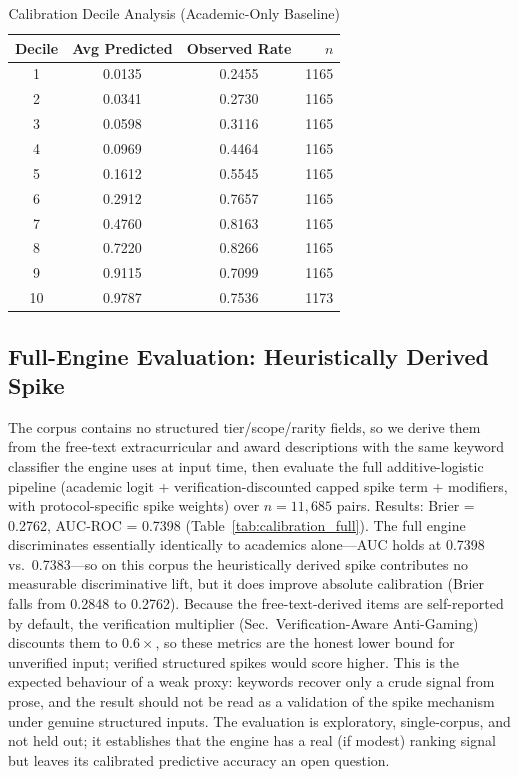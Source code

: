 \documentclass[conference]{IEEEtran}
\begin{document}
\begin{table}[!t]
\centering
\caption{Calibration Decile Analysis (Academic-Only Baseline)}
\label{tab:calibration}
\small
\begin{tabular}{cccr}
\hline
\textbf{Decile} & \textbf{Avg Predicted} & \textbf{Observed Rate} & $n$ \\
\hline
 1  & 0.0135 & 0.2455 & 1165 \\
 2  & 0.0341 & 0.2730 & 1165 \\
 3  & 0.0598 & 0.3116 & 1165 \\
 4  & 0.0969 & 0.4464 & 1165 \\
 5  & 0.1612 & 0.5545 & 1165 \\
 6  & 0.2912 & 0.7657 & 1165 \\
 7  & 0.4760 & 0.8163 & 1165 \\
 8  & 0.7220 & 0.8266 & 1165 \\
 9  & 0.9115 & 0.7099 & 1165 \\
 10 & 0.9787 & 0.7536 & 1173 \\
\hline
\end{tabular}
\end{table}

\subsection{Full-Engine Evaluation: Heuristically Derived Spike}
\label{sec:fulleval}
The corpus contains no structured tier/scope/rarity fields, so we derive them from the free-text extracurricular and award descriptions with the same keyword classifier the engine uses at input time, then evaluate the full additive-logistic pipeline (academic logit + verification-discounted capped spike term + modifiers, with protocol-specific spike weights) over $n = 11{,}685$ pairs. Results: Brier = 0.2762, AUC-ROC = 0.7398 (Table~\ref{tab:calibration_full}). The full engine discriminates essentially identically to academics alone---AUC holds at 0.7398 vs.\ 0.7383---so on this corpus the heuristically derived spike contributes no measurable discriminative lift, but it does improve absolute calibration (Brier falls from 0.2848 to 0.2762). Because the free-text-derived items are self-reported by default, the verification multiplier (Sec.~Verification-Aware Anti-Gaming) discounts them to $0.6\times$, so these metrics are the honest lower bound for unverified input; verified structured spikes would score higher. This is the expected behaviour of a weak proxy: keywords recover only a crude signal from prose, and the result should not be read as a validation of the spike mechanism under genuine structured inputs. The evaluation is exploratory, single-corpus, and not held out; it establishes that the engine has a real (if modest) ranking signal but leaves its calibrated predictive accuracy an open question.
\end{document}
